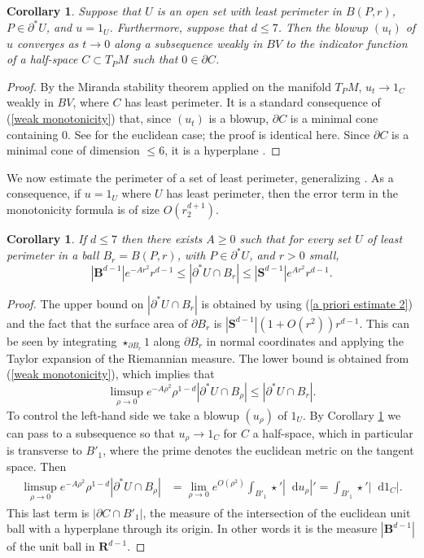 \documentclass[reqno,11pt]{amsart}
\newcommand{\RR}{\mathbf{R}}
\newcommand{\Sph}{\mathbf S}
\newcommand{\Ball}{\mathbf{B}}
\newcommand*\dif{\mathop{}\!\mathrm{d}}
\newtheorem{corollary}[theorem]{Corollary}
\theoremstyle{definition}
\numberwithin{equation}{section}
\begin{document}
\begin{corollary}\label{blowup theorem}
Suppose that $U$ is an open set with least perimeter in $B(P, r)$, $P \in \partial^* U$, and $u = 1_U$.
Furthermore, suppose that $d \leq 7$.
Then the blowup $(u_t)$ of $u$ converges as $t \to 0$ along a subsequence weakly in $BV$ to the indicator function of a half-space $C \subset T_PM$ such that $0 \in \partial C$.
\end{corollary}
\begin{proof}
By the Miranda stability theorem applied on the manifold $T_PM$, $u_t \to 1_C$ weakly in $BV$, where $C$ has least perimeter.
It is a standard consequence of (\ref{weak monotonicity}) that, since $(u_t)$ is a blowup, $\partial C$ is a minimal cone containing $0$.
See \cite[Theorem 9.3]{Giusti77} for the euclidean case; the proof is identical here.
Since $\partial C$ is a minimal cone of dimension $\leq 6$, it is a hyperplane \cite[Theorem 9.10 and Theorem 10.10]{Giusti77}.
\end{proof}

We now estimate the perimeter of a set of least perimeter, generalizing \cite[Remark 5.13]{Giusti77}.
As a consequence, if $u = 1_U$ where $U$ has least perimeter, then the error term in the monotonicity formula is of size $O(r_2^{d + 1})$.

\begin{corollary}\label{doubling dimension}
If $d \leq 7$ then there exists $A \geq 0$ such that for every set $U$ of least perimeter in a ball $B_r = B(P, r)$, with $P \in \partial^* U$, and $r > 0$ small,
$$|\Ball^{d - 1}|e^{-Ar^2}r^{d - 1} \leq |\partial^*U \cap B_r| \leq |\Sph^{d - 1}|e^{Ar^2} r^{d - 1}.$$
\end{corollary}
\begin{proof}
The upper bound on $|\partial^* U \cap B_r|$ is obtained by using (\ref{a priori estimate 2}) and the fact that the surface area of $\partial B_r$ is $|\Sph^{d - 1}|(1 + O(r^2))r^{d - 1}$.
This can be seen by integrating $\star_{\partial B_r} 1$ along $\partial B_r$ in normal coordinates and applying the Taylor expansion of the Riemannian measure.
The lower bound is obtained from (\ref{weak monotonicity}), which implies that
$$\limsup_{\rho \to 0} e^{-A\rho^2} \rho^{1 - d} |\partial^* U \cap B_\rho| \leq |\partial^* U \cap B_r|.$$
To control the left-hand side we take a blowup $(u_\rho)$ of $1_U$.
By Corollary \ref{blowup theorem} we can pass to a subsequence so that $u_\rho \to 1_C$ for $C$ a half-space, which in particular is transverse to $B'_1$, where the prime denotes the euclidean metric on the tangent space.
Then
\begin{align*}
\limsup_{\rho \to 0} e^{-A\rho^2} \rho^{1 - d} |\partial^* U \cap B_\rho| &= \lim_{\rho \to 0} e^{O(\rho^2)} \int_{B'_1} \star'|\dif u_\rho|' = \int_{B'_1} \star'|\dif 1_C|.
\end{align*}
This last term is $|\partial C \cap B'_1|$, the measure of the intersection of the euclidean unit ball with a hyperplane through its origin.
In other words it is the measure $|\Ball^{d - 1}|$ of the unit ball in $\RR^{d - 1}$.
\end{proof}
\end{document}
